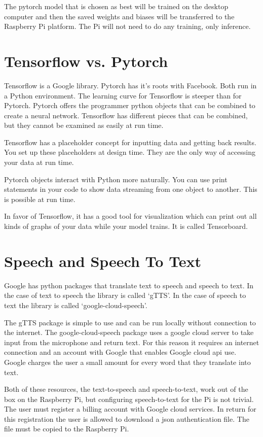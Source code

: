 The pytorch model that is chosen as best will be trained on the
desktop computer and then the saved weights and biases will be transferred
to the Raspberry Pi platform. The Pi will not need to do any training,
only inference. 



\section{Tensorflow vs. Pytorch}

Tensorflow is a Google library. Pytorch has it's roots with Facebook. Both run in a Python environment. The learning curve for Tensorflow is steeper than for Pytorch. Pytorch offers the programmer python objects that can be combined to create a neural network. Tensorflow has different pieces that can be combined, but they cannot be examined as easily at run time.

Tensorflow has a placeholder concept for inputting data and getting back results. You set up these placeholders at design time. They are the only way of accessing your data at run time.

Pytorch objects interact with Python more naturally. You can use print statements in your code to show data streaming from one object to another. This is possible at run time.

In favor of Tensorflow, it has a good tool for visualization which can print out all kinds of graphs of your data while your model trains. It is called Tensorboard.

\section{Speech and Speech To Text}

Google has python packages that translate text to speech and speech to text. In the case of text to speech the library is called `gTTS'. In the case of speech to text the library is called `google-cloud-speech'. 

The gTTS package is simple to use and can be run locally without connection to the internet. The google-cloud-speech package uses a google cloud server to take input from the microphone and return text. For this reason it requires an internet connection and an account with Google that enables Google cloud api use. Google charges the user a small amount for every word that they translate into text. 

Both of these resources, the text-to-speech and speech-to-text, work out of the box on the Raspberry Pi, but configuring speech-to-text for the Pi is not trivial. The user must register a billing account with Google cloud services. In return for this registration the user is allowed to download a json authentication file. The file must be copied to the Raspberry Pi. 

